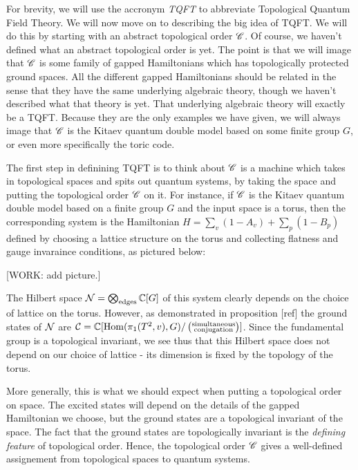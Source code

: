 \documentclass{article}
\theoremstyle{definition}
\numberwithin{figure}{section}
\begin{document}
For brevity, we will use the accronym \textit{TQFT} to abbreviate Topological Quantum Field Theory. We will now move on to describing the big idea of TQFT. We will do this by starting with an abstract topological order $\mathscr{C}$. Of course, we haven't defined what an abstract topological order is yet. The point is that we will image that $\mathscr{C}$ is some family of gapped Hamiltonians which has topologically protected ground spaces. All the different gapped Hamiltonians should be related in the sense that they have the same underlying algebraic theory, though we haven't described what that theory is yet. That underlying algebraic theory will exactly be a TQFT. Because they are the only examples we have given, we will always image that $\mathscr{C}$ is the Kitaev quantum double model based on some finite group $G$, or even more specifically the toric code.

The first step in definining TQFT is to think about $\mathscr{C}$ is a machine which takes in topological spaces and spits out quantum systems, by taking the space and putting the topological order $\mathscr{C}$ on it. For instance, if $\mathscr{C}$ is the Kitaev quantum double model based on a finite group $G$ and the input space is a torus, then the corresponding system is the Hamiltonian $H=\sum_{v}(1-A_v)+\sum_{p}(1-B_p)$ defined by choosing a lattice structure on the torus and collecting flatness and gauge invaraince conditions, as pictured below:

[WORK: add picture.]

The Hilbert space $\mathcal{N}=\bigotimes_{\text{edges}}\mathbb{C}[G]$ of this system clearly depends on the choice of lattice on the torus. However, as demonstrated in proposition [ref] the ground states of $\mathcal{N}$ are $\mathcal{C}=\mathbb{C}[\mathrm{Hom}(\pi_1(T^2,v), G)/\left(\substack{\text{simultaneous} \\ \text{conjugation}}\right)]$. Since the fundamental group is a topological invariant, we see thus that this Hilbert space does not depend on our choice of lattice - its dimension is fixed by the topology of the torus.

More generally, this is what we should expect when putting a topological order on space. The excited states will depend on the details of the gapped Hamiltonian we choose, but the ground states are a topological invariant of the space. The fact that the ground states are topologically invariant is the \textit{defining feature} of topological order. Hence, the topological order $\mathscr{C}$ gives a well-defined assignement from topological spaces to quantum systems.
\end{document}
